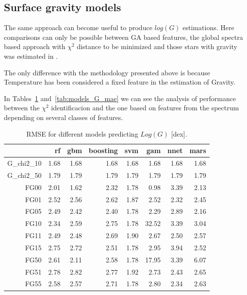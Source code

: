 %

\subsection{Surface gravity models}

The same approach can become useful to produce $log(G)$ estimations. 
Here comparisons can only be possible between GA based features, the 
global spectra based approach with $\chi^2$ distance
to be minimized and those stars with gravity was 
estimated in  \cite{2013A&A...549A.129C}.

The only difference with the methodology presented above is because
Temperature has been considered a fixed feature in the estimation of 
Gravity.

In Tables~\ref{tab:models_G_rmse} and~\ref{tab:models_G_mae} 
we can see the analysis of performance between
the $\chi^2$ identificacion and the one based on features from the spectrum
depending on several classes of features.

\begin{table}[ht]
\centering
\begin{tabular}{rrrrrrrr}
  \hline
 & rf & gbm & boosting & svm & gam & nnet & mars \\ 
  \hline
G\_chi2\_10 & 1.68 & 1.68 & 1.68 & 1.68 & 1.68 & 1.68 & 1.68 \\ 
  G\_chi2\_50 & 1.79 & 1.79 & 1.79 & 1.79 & 1.79 & 1.79 & 1.79 \\ 
  FG00 & 2.01 & 1.62 & 2.32 & 1.78 & 0.98 & 3.39 & 2.13 \\ 
  FG01 & 2.52 & 2.56 & 2.62 & 1.87 & 2.52 & 2.32 & 2.45 \\ 
  FG05 & 2.49 & 2.42 & 2.40 & 1.78 & 2.29 & 2.89 & 2.16 \\ 
  FG10 & 2.34 & 2.59 & 2.75 & 1.78 & 32.52 & 3.39 & 3.04 \\ 
  FG11 & 2.49 & 2.48 & 2.69 & 1.90 & 2.67 & 2.50 & 2.57 \\ 
  FG15 & 2.75 & 2.72 & 2.51 & 1.78 & 2.95 & 3.94 & 2.52 \\ 
  FG50 & 2.61 & 2.11 & 2.58 & 1.78 & 17.95 & 3.39 & 6.07 \\ 
  FG51 & 2.78 & 2.82 & 2.77 & 1.92 & 2.73 & 2.43 & 2.65 \\ 
  FG55 & 2.58 & 2.57 & 2.71 & 1.78 & 2.80 & 2.34 & 2.63 \\ 
   \hline
\end{tabular}
\caption { RMSE for different models predicting $Log(G)$ [dex].} 
\label{tab:models_G_rmse} 
\end{table}

